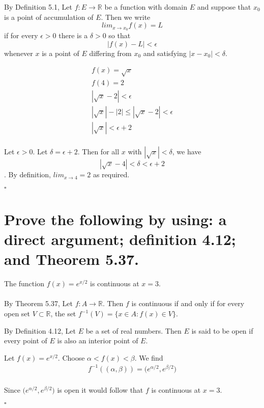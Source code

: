 \documentclass[11pt]{article}
\begin{document}
By Definition 5.1, Let $f:E \to \mathbb{R}$ be a function with domain $E$ and suppose that $x_0$ is a point of accumulation of $E$.
Then we write $$lim_{x \to x_0} f(x) = L$$
if for every $\epsilon > 0$ there is a $\delta > 0$ so that $$|f(x)-L|< \epsilon$$
whenever $x$ is a point of $E$ differing from $x_0$ and satisfying $|x-x_0|<\delta$.

\begin{equation}
	\begin{aligned}
		f(x) = \sqrt{x} \\
		f(4) = 2 \\
		|\sqrt{x} - 2| < \epsilon \\
		|\sqrt{x}| - |2| \le |\sqrt{x} - 2| < \epsilon \\
		|\sqrt{x}| < \epsilon + 2 \\
	\end{aligned}
\end{equation}

Let $\epsilon > 0$.
Let $\delta = \epsilon + 2$.
Then for all $x$ with $|\sqrt{x}| < \delta$, we have $$|\sqrt{x}-4| < \delta < \epsilon + 2$$.
By definition, $lim_{x \to 4} = 2$ as required.

$\square$

\section{Prove the following by using: a direct argument; definition 4.12; and Theorem 5.37.}

The function $f(x)=e^{x/2} $ is continuous at $x=3$.

\paragraph{}

By Theorem 5.37, Let $f:A \to \mathbb{R}$.
Then $f$ is continuous if and only if for every open set $V \subset \mathbb{R}$, the set $f^{-1}(V) = \{x \in A: f(x) \in V \}$.

By Definition 4.12, Let $E$ be a set of real numbers.
Then $E$ is said to be open if every point of $E$ is also an interior point of $E$.

Let $f(x) = e^{x/2}$.
Choose $\alpha < f(x) < \beta$.
We find
\begin{equation}
	\begin{aligned}
		f^{-1}((\alpha, \beta)) = \big ( e^{\alpha / 2}, e^{\beta / 2} \big ) \\
	\end{aligned}
\end{equation}

Since $\big ( e^{\alpha / 2}, e^{\beta / 2} \big )$ is open it would follow that $f$ is continuous at $x=3$.

$\square$

\printbibliography
\end{document}
